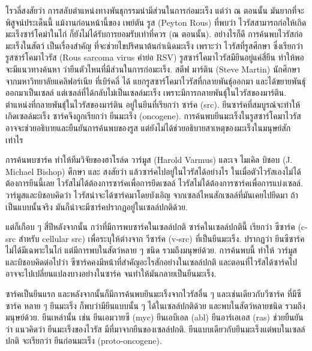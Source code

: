 {\begin{shaded}
	โรวลี่สงสัยว่า การสลับตำแหน่งทางพันธุกรรมน่ามีส่วนในการก่อมะเร็ง
	แต่ว่า ณ ตอนนั้น มันยากที่จะพิสูจน์ประเด็นนี้ 
	แม้งานก่อนหน้านี้ของ เพย์ตัน รูส (Peyton Rous) ที่พบว่า ไวรัสสามารถก่อให้เกิดมะเร็งซาร์โคม่าในไก่ ก็ยังไม่ได้รับการยอมรับเท่าที่ควร (ณ ตอนนั้น).
	อย่างไรก็ดี การค้นพบไวรัสก่อมะเร็งในสัตว์ เป็นเรื่องสำคัญ ที่จะช่วยไขปริศนาต้นกำเนิดมะเร็ง เพราะว่า ไวรัสที่รูสศึกษา ซึ่งเรียกว่า รูสซาร์โคมาไวรัส (Rous sarcoma virus คำย่อ RSV)
	รูสซาร์โคมาไวรัสมียีนอยู่แค่สี่ยีน 
	ทำให้พอจะมีแนวทางค้นหา ว่ายีนตัวไหนที่มีส่วนในการก่อมะเร็ง.
	สตีฟ มาร์ติน (Steve Martin) นักศึกษาจากมหาวิทยาลัยแคลิฟอร์เนีย ที่เบิร์คลี่ ได้ แยกรูสซาร์โคมาไวรัสที่กลายพันธุ์ออกมา 
	และได้ขยายพันธุ์ออกมาเป็นเซลล์ 
	แต่เซลล์ที่ได้กลับไม่เป็นเซลล์มะเร็ง 
	เพราะมีการกลายพันธุ์ในไวรัสของมาร์ติน.
	ตำแหน่งที่กลายพันธุ์ในไวรัสของมาร์ติน อยู่ในยีนที่เรียกว่า ซาร์ค (src).
	ยีนซาร์คที่สมบูรณ์จะทำให้เกิดเซลล์มะเร็ง ซาร์คจึงถูกเรียกว่า ยีนมะเร็ง (oncogene).
	การค้นพบยีนมะเร็งในรูสซาร์โคมาไวรัส อาจจะช่วยอธิบายและยืนยันการค้นพบของรูส แต่ยังไม่ได้ช่วยอธิบายสาเหตุของมะเร็งในมนุษย์สักเท่าไร
	
	การค้นพบซาร์ค ทำให้ทีมวิจัยของฮาโรล์ด วาร์มูส (Harold Varmus) และเจ ไมเคิล บิชอบ (J. Michael Bishop) ศึกษา และ	สงสัยว่า แล้วซาร์คไปอยู่ในไวรัสได้อย่างไร ในเมื่อตัวไวรัสเองไม่ได้ต้องการยีนนี้เลย ไวรัสไม่ได้ต้องการซาร์คเพื่อการยึดเซลล์ ไวรัสไม่ได้ต้องการซาร์คเพื่อการแบ่งเซลล์.
	วาร์มูสและบิชอบคิดว่า ไวรัสน่าจะได้ซาร์คมาโดยบังเอิญ 
	จากเซลล์ไหนสักเซลล์ที่มันเคยไปยึดมา 
	ถ้าเป็นแบบนั้นจริง มันก็น่าจะมีซาร์คปรากฏอยู่ในเซลล์ปกติด้วย.
	
	แต่ก็เกือบ ๆ สี่ปีหลังจากนั้น 
	กว่าที่มีการพบซาร์คในเซลล์ปกติ ซาร์คในเซลล์ปกตินี้ เรียกว่า {ซีซาร์ค} (c-src สำหรับ cellular src) เพื่อระบุให้ต่างจาก {วีซาร์ค} (v-src) ที่เป็นยีนมะเร็ง.
	ปรากฏว่า {ยีนซีซาร์ค}ไม่ได้มีเฉพาะในไก่ แต่มีการพบในสัตว์หลาย ๆ ชนิด รวมถึงมนุษย์ด้วย.
	การค้นพบนี้ ทำให้ วาร์มูสและบิชอบคิดต่อไปว่า
	{ซีซาร์ค}คงมีหน้าที่สำคัญอะไรสักอย่างในเซลล์ปกติ
	และตอนที่ไวรัสได้ซาร์คไป 
	อาจจะไปเปลี่ยนแปลงบางอย่างในซาร์ค จนทำให้มันกลายเป็นยีนมะเร็ง.
	
	ซาร์คเป็นยีนแรก และหลังจากนั้นก็มีการค้นพบยีนมะเร็งจากไวรัสอื่น ๆ และเช่นเดียวกับวีซาร์ค ที่มีซีซาร์ค
	หลาย ๆ ยีนมะเร็ง ก็พบว่ามียีนแบบนั้น ๆ ได้ในเซลล์ปกติด้วย และพบในสัตว์หลายชนิด รวมถึงมนุษย์ด้วย. 
	ยีนเหล่านั้น เช่น 
	ยีนเอมวายซี (myc)
	ยีนเอบีเอล (abl)
	ยีนอาร์เอเอส (ras)
	ช่วยยืนยันว่า แนวคิดว่า ยีนมะเร็งของไวรัส มีที่มาจากยีนของเซลล์ปกติ.
	ยีนแบบเดียวกับยีนมะเร็งแต่พบในเซลล์ปกติ จะเรียกว่า ยีนก่อนมะเร็ง (proto-oncogene).
	

\end{shaded}}
